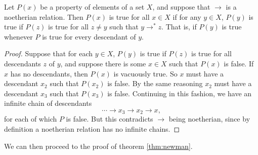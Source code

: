 \documentclass[11pt,libertine,widepage,nosubthm]{lmaths}
\begin{document}
\begin{prop}
	Let $P(x)$ be a property of elements of a set $X$, and suppose that $\rightarrow$ is a noetherian relation. Then $P(x)$ is true for all $x \in X$ if for any $y \in X$, $P(y)$ is true if $P(z)$ is true for all $z \ne y$ such that $y \rightarrow^* z$. That is, if $P(y)$ is true whenever $P$ is true for every descendant of $y$.
\end{prop}
\begin{proof}
	Suppose that for each $y \in X$, $P(y)$ is true if $P(z)$ is true for all descendants $z$ of $y$, and suppose there is some $x \in X$ such that $P(x)$ is false. If $x$ has no descendants, then $P(x)$ is vacuously true. So $x$ must have a descendant $x_2$ such that $P(x_2)$ is false. By the same reasoning $x_2$ must have a descendant $x_3$ such that $P(x_3)$ is false. Continuing in this fashion, we have an infinite chain of descendants
		\[ \cdots \to x_3 \to x_2 \to x, \]
	for each of which $P$ is false. But this contradicts $\to$ being noetherian, since by definition a noetherian relation has no infinite chains.
\end{proof}

We can then proceed to the proof of theorem \ref{thm:newman}.
\end{document}
